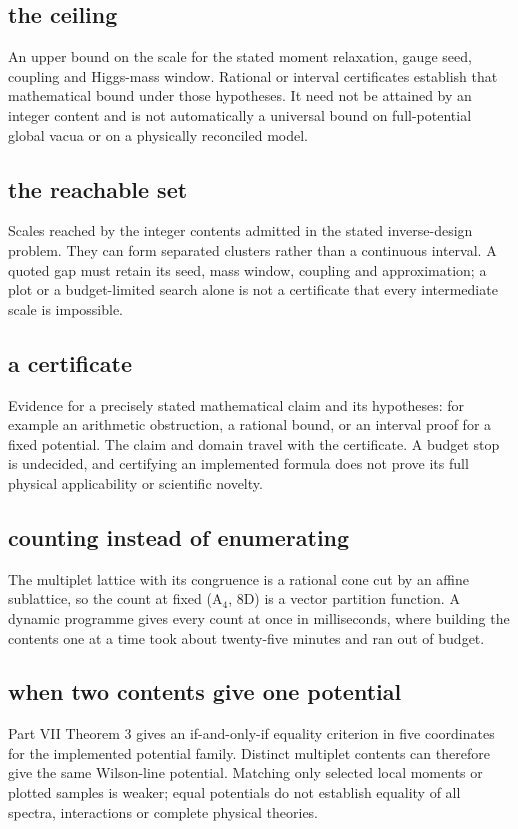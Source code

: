 \documentclass[11pt,a4paper]{article}
\begin{document}
\subsection*{the ceiling}
An upper bound on the scale for the stated moment relaxation, gauge seed, coupling and Higgs-mass window. Rational or interval certificates establish that mathematical bound under those hypotheses. It need not be attained by an integer content and is not automatically a universal bound on full-potential global vacua or on a physically reconciled model.

\subsection*{the reachable set}
Scales reached by the integer contents admitted in the stated inverse-design problem. They can form separated clusters rather than a continuous interval. A quoted gap must retain its seed, mass window, coupling and approximation; a plot or a budget-limited search alone is not a certificate that every intermediate scale is impossible.

\subsection*{a certificate}
Evidence for a precisely stated mathematical claim and its hypotheses: for example an arithmetic obstruction, a rational bound, or an interval proof for a fixed potential. The claim and domain travel with the certificate. A budget stop is undecided, and certifying an implemented formula does not prove its full physical applicability or scientific novelty.

\subsection*{counting instead of enumerating}
The multiplet lattice with its congruence is a rational cone cut by an affine sublattice, so the count at fixed (A\ensuremath{{}_{4}}, 8D) is a vector partition function. A dynamic programme gives every count at once in milliseconds, where building the contents one at a time took about twenty-five minutes and ran out of budget.

\subsection*{when two contents give one potential}
Part VII Theorem 3 gives an if-and-only-if equality criterion in five coordinates for the implemented potential family. Distinct multiplet contents can therefore give the same Wilson-line potential. Matching only selected local moments or plotted samples is weaker; equal potentials do not establish equality of all spectra, interactions or complete physical theories.
\end{document}
